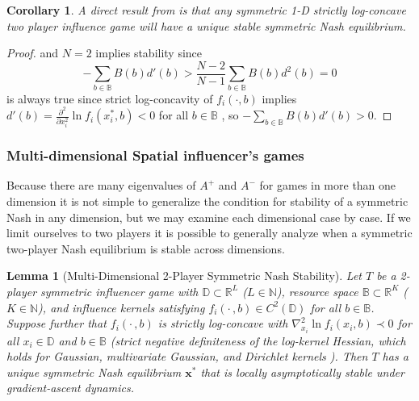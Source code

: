 \documentclass{article}
\newtheorem{corollary}{Corollary}[theorem]
\newtheorem{lemma}[theorem]{Lemma}
\newcommand {\B}{\mathbb{B}}
\begin{document}
                \begin{corollary}
                    A direct result from  is that any symmetric 1-D strictly log-concave two player influence game will have a unique stable symmetric Nash equilibrium. 
                \end{corollary}
                \begin{proof}
                     and $N=2$ implies stability since
                    \begin{equation}
                          -\sum_{b\in \B} B(b)d'(b)>\frac{N-2}{N-1}\sum_{b\in \B} B(b)d^2(b)=0
                    \end{equation}
                    is always true since strict log-concavity of $f_i(\cdot,b)$ implies $d'(b) = \frac{\partial^2}{\partial x_i^2}\ln f_i(x_i^*,b) < 0$ for all $b\in\mathbb{B}$ \cite{saumard2014log}, so $-\sum_{b\in\mathbb{B}} B(b)d'(b) > 0$. 
                \end{proof}
            \subsubsection{Multi-dimensional Spatial influencer's games}
                Because there are many eigenvalues of $A^+$ and $A^-$ for games in more than one dimension it is not simple to generalize the condition for stability of a symmetric Nash in any dimension, but we may examine each dimensional case by case. If we limit ourselves to two players it is possible to generally analyze when a symmetric two-player Nash equilibrium is stable across dimensions.
                
\begin{lemma}[Multi-Dimensional 2-Player Symmetric Nash
                Stability]\label{lem:SI_two_player_stability_multi_dim}
                    Let $T$ be a 2-player symmetric influencer game with $\mathbb{D} \subset \mathbb{R}^L$ ($L\in\mathbb{N}$), resource space $\mathbb{B}\subset\mathbb{R}^K$ ($K\in\mathbb{N}$), and influence kernels satisfying $f_i(\cdot\,,b)\in C^2(\mathbb{D})$ for all $b\in\mathbb{B}$. Suppose further that $f_i(\cdot\,,b)$ is strictly log-concave with $\nabla_{x_i}^2\ln f_i(x_i,b)\prec 0$ for all $x_i\in\mathbb{D}$ and $b\in\mathbb{B}$ (strict negative definiteness of the log-kernel Hessian, which holds for Gaussian, multivariate Gaussian, and Dirichlet kernels \cite{saumard2014log}). Then $T$ has a unique symmetric Nash equilibrium $\mathbf{x}^*$ that is locally asymptotically stable under gradient-ascent dynamics.
                \end{lemma}
\end{document}
